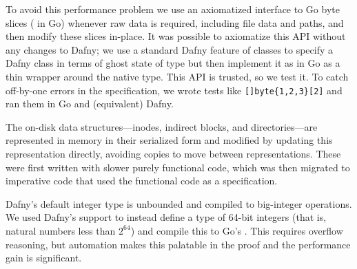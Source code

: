 To avoid this performance problem we use an axiomatized interface to
Go byte slices ( in Go) whenever raw data is required, including file
data and paths, and then modify these slices in-place. It was possible to
axiomatize this API without any changes to Dafny; we use a standard Dafny
feature of  classes to specify a Dafny class  in terms of
ghost state of type  but then implement it as in Go as a thin
wrapper around the native  type. This API is trusted, so we
test it. To catch off-by-one errors in the specification, we wrote
tests like \verb![]byte{1,2,3}[2]! and ran them in Go and
(equivalent) Dafny.

The on-disk data structures---inodes, indirect
blocks, and directories---are represented in memory in their serialized form and
modified by updating this representation directly, avoiding copies to move
between representations. These were first written with slower purely
functional code, which was then migrated to imperative code that
used the functional code as a specification.


Dafny's default integer type  is unbounded and compiled to big-integer
operations. We used Dafny's
 support to instead define a type of 64-bit integers (that
is, natural numbers less than $2^{64}$) and compile this to Go's .
This requires overflow reasoning, but
automation makes this palatable in the proof and the performance gain is
significant.
